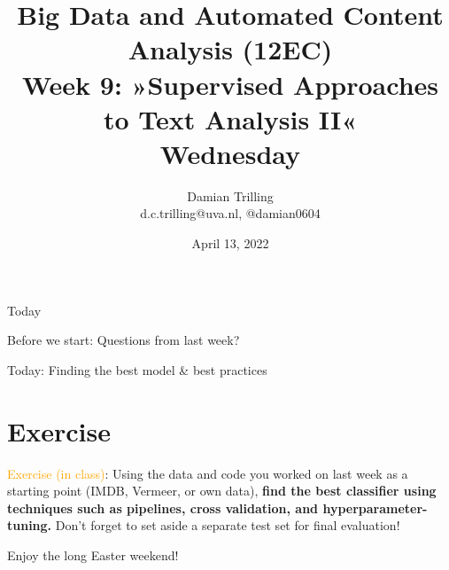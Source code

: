

\graphicspath{{../../resources/img/}}




\title[Big Data and Automated Content Analysis]{\textbf{Big Data and Automated Content Analysis (12EC)} 
\\Week 9: »Supervised Approaches to Text Analysis II«
\\Wednesday}
\author[Damian Trilling]{Damian Trilling\\ \footnotesize{d.c.trilling@uva.nl, @damian0604 \\}}
\date{April 13, 2022}


\begin{frame}{}
	\titlepage
\end{frame}

\begin{frame}{Today}
	\tableofcontents
\end{frame}


\begin{frame}[standout]
Before we start: Questions from last week?
\end{frame}


\begin{frame}[standout]
Today: Finding the best model \& best practices
\end{frame}









\section{Exercise}


\begin{frame}[standout]
\textcolor{orange}{Exercise (in class)}: Using the data and code you worked on last week as a starting point (IMDB, Vermeer, or own data), \textbf{find the best classifier using techniques such as pipelines, cross validation, and hyperparameter-tuning.} Don't forget to set aside a separate test set for final evaluation!
\end{frame}



\begin{frame}[standout]
Enjoy the long Easter weekend!
\end{frame}





\begin{frame}
	\printbibliography
\end{frame}




